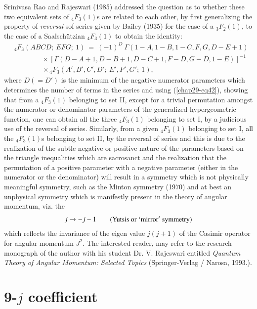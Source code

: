 Srinivasa Rao and Rajeswari (1985) addressed the question as to whether these two equivalent sets of $_4F_3(1)$s are related to each other, by first generalizing the property of \textit{reversal} sof series given by Bailey (1935) for the case of a $_3F_2(1)$, to the case of a Saalschützian $_4F_3(1)$ to obtain the identity:
\begin{equation}
\begin{split}
& {}_4F_3(ABCD;\ EFG;\ 1)\ =\ (-1)^D\ \Gamma(1-A,1-B,1-C,F,G,D-E+1)\\
& \qquad\qquad\times [\Gamma(D-A+1, D-B+1, D-C+1, F-D, G-D, 1-E)]^{-1}\\
& \qquad\qquad\times {}_4F_3(A',B',C',D';\ E',F',G';\ 1), \label{chap29-eq42}
\end{split}
\end{equation}
where $D(=D')$ is the minimum of the negative numerator parameters which determines the number of terms in the series and using (\eqref{chap29-eq42}), showing that from a $_4F_3(1)$ belonging to set II, except for a trivial permutation amongst the numerator or denominator parameters of the generalized hypergeometric function, one can obtain all the three $_4F_3(1)$ belonging to set I, by a judicious use of the reversal of series. Similarly, from a given $_4F_3(1)$ belonging to set I, all the $_4F_3(1)$s belonging to set II, by the reversal of series and this is due to the realization of the subtle negative or positive nature of the parameters based on the triangle inequalities which are sacrosanct and the realization that the permutation of a positive parameter with a negative parameter (either in the numerator or the denominator) will result in a symmetry which is not physically meaningful symmetry, such as the Minton symmetry (1970) and at best an unphysical symmetry which is manifestly present in the theory of angular momentum, viz. the
\begin{equation} 
j\rightarrow -j-1 \qquad ({\rm Yutsis\ or\ `mirror'\ symmetry}) \label{chap29-eq43}
\end{equation}
which reflects the invariance of the eigen value $j(j+1)$ of the Casimir operator for angular momentum $J^2$. The interested reader, may refer to the research monograph of the author with his student Dr. V. Rajeswari entitled \textit{Quantum Theory of Angular Momentum: Selected Topics} (Springer-Verlag / Narosa, 1993.).

\section*{9-$j$ coefficient}

